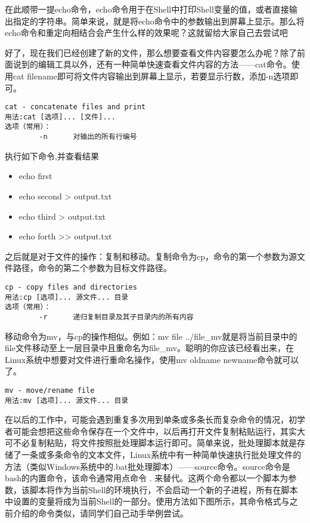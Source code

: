 在此顺带一提echo命令，echo命令用于在Shell中打印Shell变量的值，或者直接输出指定的字符串。简单来说，就是将echo命令中的参数输出到屏幕上显示。那么将echo命令和重定向相结合会产生什么样的效果呢？这就留给大家自己去尝试吧~

好了，现在我们已经创建了新的文件，那么想要查看文件内容要怎么办呢？除了前面说到的编辑工具以外，还有一种简单快速查看文件内容的方法——cat命令。使用cat filename即可将文件内容输出到屏幕上显示，若要显示行数，添加-n选项即可。

\begin{verbatim}
cat - concatenate files and print
用法:cat [选项]... [文件]...
选项（常用）：
		-n		对输出的所有行编号
\end{verbatim}

\begin{exercise}
	执行如下命令,并查看结果
	\begin{itemize}
		\item echo first
		\item echo second > output.txt
		\item echo third > output.txt
		\item echo forth >> output.txt
	\end{itemize}
\end{exercise}
之后就是对于文件的操作：复制和移动。复制命令为cp，命令的第一个参数为源文件路径，命令的第二个参数为目标文件路径。

\begin{verbatim}
cp - copy files and directories
用法:cp [选项]... 源文件... 目录
选项（常用）：
		-r		递归复制目录及其子目录内的所有内容
\end{verbatim}

移动命令为mv，与cp的操作相似。例如：mv file ../file\_mv就是将当前目录中的file文件移动至上一层目录中且重命名为file\_mv。聪明的你应该已经看出来，在Linux系统中想要对文件进行重命名操作，使用mv oldname newname命令就可以了。
\begin{verbatim}
mv - move/rename file
用法:mv [选项]... 源文件... 目录
\end{verbatim}

在以后的工作中，可能会遇到重复多次用到单条或多条长而复杂命令的情况，初学者可能会想把这些命令保存在一个文件中，以后再打开文件复制粘贴运行，其实大可不必复制粘贴，将文件按照批处理脚本运行即可。简单来说，批处理脚本就是存储了一条或多条命令的文本文件，Linux系统中有一种简单快速执行批处理文件的方法（类似Windows系统中的.bat批处理脚本）——source命令。source命令是bash的内置命令，该命令通常用点命令 . 来替代。这两个命令都以一个脚本为参数，该脚本将作为当前Shell的环境执行，不会启动一个新的子进程，所有在脚本中设置的变量将成为当前Shell的一部分。使用方法如下图所示，其命令格式与之前介绍的命令类似，请同学们自己动手举例尝试。

